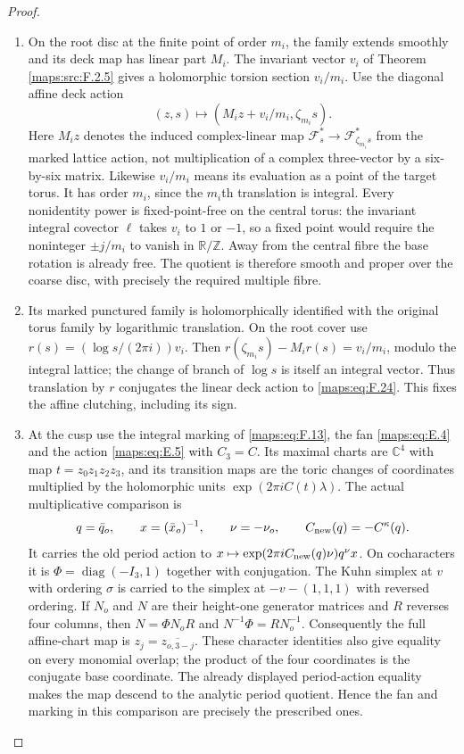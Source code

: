 \begin{proof}
\begin{enumerate}[label=\arabic*.]
\item On the root disc at the finite point of order $m_i$, the family
extends smoothly and its deck map has linear part $M_i$.
The invariant vector $v_i$ of Theorem \ref{maps:src:F.2.5} gives a holomorphic
torsion section $v_i/m_i$.  Use the diagonal affine deck action
\[
 (z,s)\longmapsto(M_i z+v_i/m_i,\zeta_{m_i}s).
 \tag{F.24}\label{maps:eq:F.24}
\]
Here $M_i z$ denotes the induced complex-linear map
$\mathcal F_s^*\to\mathcal F_{\zeta_{m_i}s}^*$ from the marked
lattice action, not multiplication of a complex three-vector
by a six-by-six matrix.  Likewise $v_i/m_i$ means its evaluation
as a point of the target torus.
It has order $m_i$, since the $m_i$th translation is integral.
Every nonidentity power is fixed-point-free on the central
torus: the invariant integral covector $\ell$ takes $v_i$ to
$1$ or $-1$, so a fixed point would require the noninteger
$\pm j/m_i$ to vanish in $\mathbb R/\mathbb Z$.
Away from the central fibre the base rotation is already free.
The quotient is therefore smooth and proper over the coarse
disc, with precisely the required multiple fibre.

\item Its marked punctured family is holomorphically identified with
the original torus family by logarithmic translation.  On the
root cover use $r(s)=(\log s/(2\pi i))v_i$.  Then
$r(\zeta_{m_i}s)-M_i r(s)=v_i/m_i$, modulo the integral lattice;
the change of branch of $\log s$ is itself an integral vector.
Thus translation by $r$ conjugates the linear deck action to
\eqref{maps:eq:F.24}.  This fixes the affine clutching, including its sign.

\item At the cusp use the integral marking of \eqref{maps:eq:F.13}, the fan \eqref{maps:eq:E.4}
and the action \eqref{maps:eq:E.5} with $C_3=C$.
Its maximal charts are $\mathbb C^4$ with map
$t=z_0z_1z_2z_3$, and its transition maps are the toric changes
of coordinates multiplied by the holomorphic units
$\exp(2\pi i C(t)\lambda)$.
The actual multiplicative comparison is
\[
 q=\bar q_o,\qquad x=(\bar x_o)^{-1},\qquad
 \nu=-\nu_o,
 \qquad C_{\rm new}(q)=-C^\kappa(q).
\]
It carries the old period action to
$x\mapsto\exp(2\pi iC_{\rm new}(q)\nu)q^\nu x$.
On cocharacters it is
$\Phi=\operatorname{diag}(-I_3,1)$ together with conjugation.
The Kuhn simplex at $v$ with ordering $\sigma$ is carried to
the simplex at $-v-(1,1,1)$ with reversed ordering.
If $N_o$ and $N$ are their height-one generator matrices and
$R$ reverses four columns, then
$N=\Phi N_oR$ and $N^{-1}\Phi=RN_o^{-1}$.
Consequently the full affine-chart map is
$z_j=\overline{z_{o,3-j}}$.  These character identities also
give equality on every monomial overlap; the product of the
four coordinates is the conjugate base coordinate.
The already displayed period-action equality makes the map
descend to the analytic period quotient.  Hence the fan and
marking in this comparison are precisely the prescribed ones.


\end{enumerate}
\end{proof}
